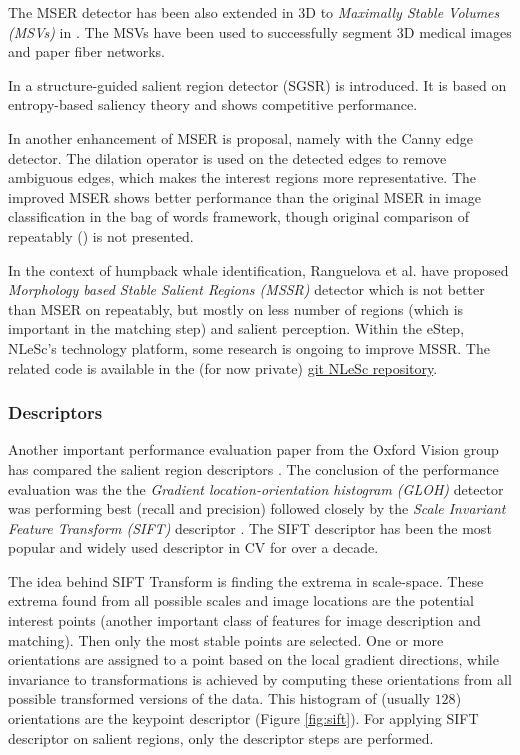 The MSER detector has been also extended in 3D to {\em Maximally Stable Volumes (MSVs)} in \cite{DonoserB06}. The MSVs have been used to successfully segment 3D medical images and paper fiber networks.

In \cite{Fan08} a structure-guided salient region detector (SGSR) is introduced. It is based on entropy-based saliency theory and shows competitive performance.

In \cite{Wang14} another enhancement of MSER is proposal, namely with the Canny edge detector. The dilation operator is used on the detected edges to remove ambiguous edges, which makes the interest regions more representative. The improved MSER shows better performance than the original MSER in image classification in the bag of words framework, though original comparison of repeatably (\cite{Mikolajczyk:2005}) is not presented. 

In the context of humpback whale identification, Ranguelova et al. \cite{RangMSSR06, RangHumpb06} have proposed {\em Morphology based Stable Salient Regions (MSSR) } detector which is not better than MSER on repeatably, but mostly on less number of regions (which is important in the matching step) and salient perception. Within the eStep, NLeSc's technology platform, some research is ongoing to improve MSSR. The related code is available in the (for now private) \href{https://github.com/NLeSC/LargeScaleImaging/tree/master/Software}{git NLeSc repository}.

\subsubsection{Descriptors}
Another important performance evaluation paper from the Oxford Vision group has compared the salient region descriptors \cite{MS05}. The conclusion of the performance evaluation was the the {\em Gradient location-orientation histogram (GLOH)} detector was performing best (recall and precision) followed closely by the {\em Scale Invariant Feature Transform (SIFT)} descriptor \cite{Lowe:2004}. The SIFT descriptor has been the most popular and widely used descriptor in CV for over a decade. 

The idea behind SIFT Transform is finding the extrema in scale-space. These extrema found from all possible scales and image locations are the potential interest points (another important class of features for image description and matching). Then only the most stable points are selected. One or more orientations are assigned to a point based on the local gradient directions, while invariance to transformations is achieved by computing these orientations from all possible transformed versions of the data.  This histogram of (usually $128$) orientations are the keypoint descriptor (Figure \ref{fig:sift}). For applying SIFT descriptor on salient regions, only the descriptor steps are performed. 

